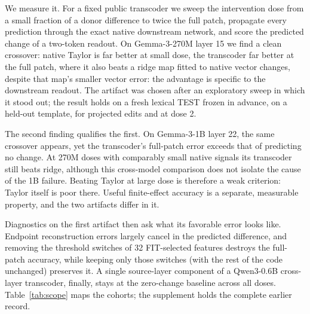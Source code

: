 \documentclass[11pt]{article}
\begin{document}
We measure it. For a fixed public transcoder we sweep the intervention dose from a small fraction of a donor difference to twice the full patch, propagate every prediction through the exact native downstream network, and score the predicted change of a two-token readout. On Gemma-3-270M layer 15 we find a clean crossover: native Taylor is far better at small dose, the transcoder far better at the full patch, where it also beats a ridge map fitted to native vector changes, despite that map's smaller vector error: the advantage is specific to the downstream readout. The artifact was chosen after an exploratory sweep in which it stood out; the result holds on a fresh lexical TEST frozen in advance, on a held-out template, for projected edits and at dose 2.

The second finding qualifies the first. On Gemma-3-1B layer 22, the same crossover appears, yet the transcoder's full-patch error exceeds that of predicting no change. At 270M doses with comparably small native signals its transcoder still beats ridge, although this cross-model comparison does not isolate the cause of the 1B failure. Beating Taylor at large dose is therefore a weak criterion: Taylor itself is poor there. Useful finite-effect accuracy is a separate, measurable property, and the two artifacts differ in it.

Diagnostics on the first artifact then ask what its favorable error looks like. Endpoint reconstruction errors largely cancel in the predicted difference, and removing the threshold switches of 32 FIT-selected features destroys the full-patch accuracy, while keeping only those switches (with the rest of the code unchanged) preserves it. A single source-layer component of a Qwen3-0.6B cross-layer transcoder, finally, stays at the zero-change baseline across all doses. Table~\ref{tab:scope} maps the cohorts; the supplement holds the complete earlier record.
\end{document}
